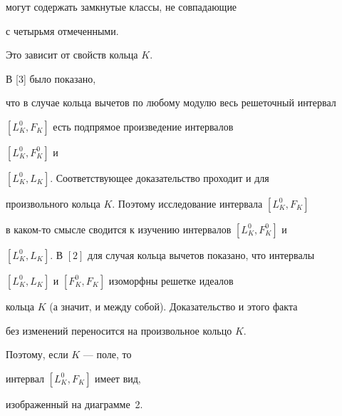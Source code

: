 могут содержать замкнутые классы, не совпадающие


с четырьмя отмеченными.


Это зависит от свойств кольца $K$.











В [3] было показано,


что в случае кольца вычетов по любому модулю весь решеточный интервал


$[{L^0_K}, {F_K}]$ есть подпрямое произведение интервалов


$[{L^0_K}, {F^0_K}]$ и


$[{L^0_K}, {L_K}]$. Соответствующее доказательство проходит и для


произвольного кольца $K$. Поэтому исследование интервала $[{L^0_K}, {F_K}]$


в каком-то смысле сводится к изучению интервалов $[{L^0_K}, {F^0_K}]$ и


$[{L^0_K}, {L_K}]$. В $[2]$ для случая кольца вычетов показано, что интервалы


$[{L^0_K}, {L_K}]$ и $[{F^0_K}, {F_K}]$ изоморфны решетке идеалов


кольца $K$ (а значит, и между собой). Доказательство и этого факта


без изменений переносится на произвольное кольцо $K$. 


Поэтому, если $K$ --- поле, то


интервал $[{L^0_K}, {F_K}]$ имеет вид,


изображенный на диаграмме~2.





